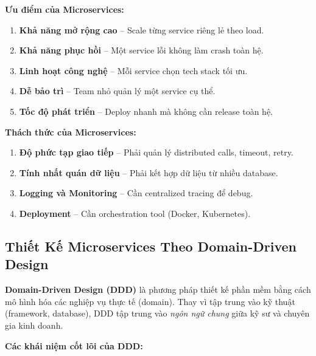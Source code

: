 \documentclass[12pt,a4paper]{article}
\begin{document}
\textbf{Ưu điểm của Microservices:}
\begin{enumerate}
    \item \textbf{Khả năng mở rộng cao} – Scale từng service riêng lẻ theo load.
    \item \textbf{Khả năng phục hồi} – Một service lỗi không làm crash toàn hệ.
    \item \textbf{Linh hoạt công nghệ} – Mỗi service chọn tech stack tối ưu.
    \item \textbf{Dễ bảo trì} – Team nhỏ quản lý một service cụ thể.
    \item \textbf{Tốc độ phát triển} – Deploy nhanh mà không cần release toàn hệ.
\end{enumerate}

\textbf{Thách thức của Microservices:}
\begin{enumerate}
    \item \textbf{Độ phức tạp giao tiếp} – Phải quản lý distributed calls, timeout, retry.
    \item \textbf{Tính nhất quán dữ liệu} – Phải kết hợp dữ liệu từ nhiều database.
    \item \textbf{Logging và Monitoring} – Cần centralized tracing để debug.
    \item \textbf{Deployment} – Cần orchestration tool (Docker, Kubernetes).
\end{enumerate}

\subsection{Thiết Kế Microservices Theo Domain-Driven Design}

\textbf{Domain-Driven Design (DDD)} là phương pháp thiết kế phần mềm bằng cách mô hình hóa các nghiệp vụ thực tế (domain). Thay vì tập trung vào kỹ thuật (framework, database), DDD tập trung vào \textit{ngôn ngữ chung} giữa kỹ sư và chuyên gia kinh doanh.

\textbf{Các khái niệm cốt lõi của DDD:}
\end{document}
